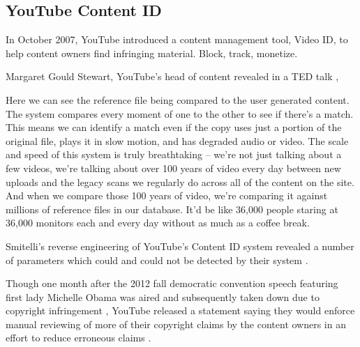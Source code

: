 \documentclass[a4paper,10pt,final]{ThesisStyle}
\begin{document}
\subsection{YouTube Content ID}

In October 2007, YouTube introduced a content management tool, Video ID, to help content owners find infringing material.  Block, track, monetize.

Margaret Gould Stewart, YouTube's head of content revealed in a TED talk \cite{Stewart2010},

\begin{quotationb}
Here we can see the reference file being compared to the user generated content. The system compares every moment of one to the other to see if there's a match. This means we can identify a match even if the copy uses just a portion of the original file, plays it in slow motion, and has degraded audio or video.  The scale and speed of this system is truly breathtaking -- we're not just talking about a few videos, we're talking about over 100 years of video every day between new uploads and the legacy scans we regularly do across all of the content on the site. And when we compare those 100 years of video, we're comparing it against millions of reference files in our database. It'd be like 36,000 people staring at 36,000 monitors each and every day without as much as a coffee break.
\end{quotationb}

Smitelli's reverse engineering of YouTube's Content ID system revealed a number of parameters which could and could not be detected by their system \cite{Smitelli2009}.  

Though one month after the 2012 fall democratic convention speech featuring first lady Michelle Obama was aired and subsequently taken down due to copyright infringement \cite{Singel2012}, YouTube released a statement saying they would enforce manual reviewing of more of their copyright claims by the content owners in an effort to reduce erroneous claims \cite{Alfishawi2012}.  





\end{document}
